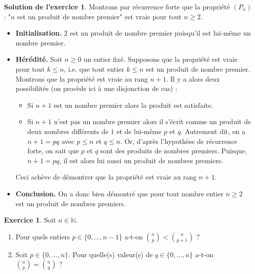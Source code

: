\documentclass[a4paper, 11pt,openany]{article}%
\theoremstyle{plain}
\theoremstyle{definition}
\newtheorem{exo}{Exercice}
\newtheorem{sol}{Solution de l'exercice}
\theoremstyle{remark}
\newcommand{\N}{\mathbb{N}}
\begin{document}
\begin{sol}
Montrons par récurrence forte que la propriété $(P_n)$ : "$n$ est un produit de nombre premier" est vraie pour tout $n \geqslant 2$.
  \begin{itemize}
 \item \textbf{Initialisation.} $2$ est un produit de nombre premier puisqu'il est lui-même un nombre premier.
 \item \textbf{Hérédité.} Soit $n \geqslant 0$ un entier fixé. Supposons que la propriété est vraie pour tout $k \leqslant n$, i.e. que tout entier $k \leqslant n$ est un produit de nombre premier. Montrons que la propriété est vraie au rang $n+1$. Il y a alors deux possibilités (on procède ici à une disjonction de cas) :
 \begin{itemize}
 \item Si $n+1$ est un nombre premier alors la produit est satisfaite.
 \item Si $n+1$ n'est pas un nombre premier alors il s'écrit comme un produit de deux nombres différents de $1$ et de lui-même $p$ et $q$. Autrement dit, on a $n+1 = pq$ avec $p \leqslant n$ et $q\leqslant n$. Or, d'après l'hypothèse de récurrence forte, on sait que $p$ et $q$ sont des produits de nombres premiers. Puisque, $n+1 = pq$, il est alors lui aussi un produit de nombres premiers.
 \end{itemize}
 Ceci achève de démontrer que la propriété est vraie au rang $n+1$.
 \item \textbf{Conclusion.} On a donc bien démontré que pour tout nombre entier $n \geqslant 2$ est un produit de nombres premiers.
 \end{itemize}
\end{sol}


\begin{exo}
Soit $n \in \N$.
\begin{enumerate}
\item Pour quels entiers $p \in \{0,...,n-1\}$ a-t-on $\binom{n}{p} < \binom{n}{p+1}$ ?
\item Soit $p \in \{0,...,n\}$. Pour quelle(s) valeur(s) de $q \in \{0,...,n\}$ a-t-on $\binom{n}{p} = \binom{n}{q}$ ? 
\end{enumerate}

\end{exo}
\end{document}

